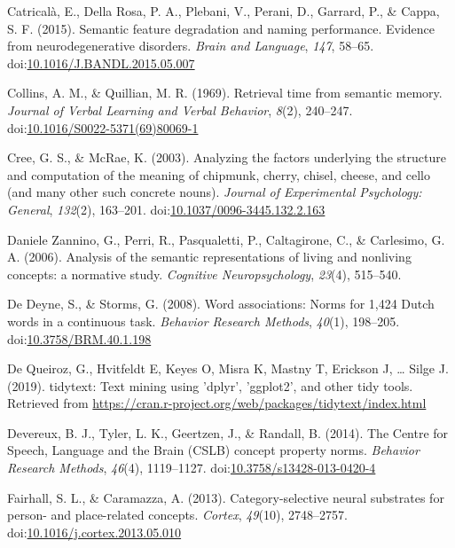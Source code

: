 \documentclass[man]{apa6}
\begin{document}
\leavevmode\hypertarget{ref-Catricala2015}{}%
Catricalà, E., Della Rosa, P. A., Plebani, V., Perani, D., Garrard, P., \& Cappa, S. F. (2015). Semantic feature degradation and naming performance. Evidence from neurodegenerative disorders. \emph{Brain and Language}, \emph{147}, 58--65. doi:\href{https://doi.org/10.1016/J.BANDL.2015.05.007}{10.1016/J.BANDL.2015.05.007}

\leavevmode\hypertarget{ref-Collins1969}{}%
Collins, A. M., \& Quillian, M. R. (1969). Retrieval time from semantic memory. \emph{Journal of Verbal Learning and Verbal Behavior}, \emph{8}(2), 240--247. doi:\href{https://doi.org/10.1016/S0022-5371(69)80069-1}{10.1016/S0022-5371(69)80069-1}

\leavevmode\hypertarget{ref-Cree2003}{}%
Cree, G. S., \& McRae, K. (2003). Analyzing the factors underlying the structure and computation of the meaning of chipmunk, cherry, chisel, cheese, and cello (and many other such concrete nouns). \emph{Journal of Experimental Psychology: General}, \emph{132}(2), 163--201. doi:\href{https://doi.org/10.1037/0096-3445.132.2.163}{10.1037/0096-3445.132.2.163}

\leavevmode\hypertarget{ref-DanieleZannino2006}{}%
Daniele Zannino, G., Perri, R., Pasqualetti, P., Caltagirone, C., \& Carlesimo, G. A. (2006). Analysis of the semantic representations of living and nonliving concepts: a normative study. \emph{Cognitive Neuropsychology}, \emph{23}(4), 515--540.

\leavevmode\hypertarget{ref-DeDeyne2008c}{}%
De Deyne, S., \& Storms, G. (2008). Word associations: Norms for 1,424 Dutch words in a continuous task. \emph{Behavior Research Methods}, \emph{40}(1), 198--205. doi:\href{https://doi.org/10.3758/BRM.40.1.198}{10.3758/BRM.40.1.198}

\leavevmode\hypertarget{ref-DeQueiroz2019}{}%
De Queiroz, G., Hvitfeldt E, Keyes O, Misra K, Mastny T, Erickson J, \ldots{} Silge J. (2019). tidytext: Text mining using 'dplyr', 'ggplot2', and other tidy tools. Retrieved from \url{https://cran.r-project.org/web/packages/tidytext/index.html}

\leavevmode\hypertarget{ref-Devereux2014}{}%
Devereux, B. J., Tyler, L. K., Geertzen, J., \& Randall, B. (2014). The Centre for Speech, Language and the Brain (CSLB) concept property norms. \emph{Behavior Research Methods}, \emph{46}(4), 1119--1127. doi:\href{https://doi.org/10.3758/s13428-013-0420-4}{10.3758/s13428-013-0420-4}

\leavevmode\hypertarget{ref-Fairhall2013}{}%
Fairhall, S. L., \& Caramazza, A. (2013). Category-selective neural substrates for person- and place-related concepts. \emph{Cortex}, \emph{49}(10), 2748--2757. doi:\href{https://doi.org/10.1016/j.cortex.2013.05.010}{10.1016/j.cortex.2013.05.010}
\end{document}
